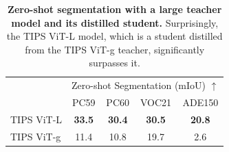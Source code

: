 \begin{table}[t]
\caption{\small\textbf{Zero-shot segmentation with a large teacher model and its distilled student.} Surprisingly, the TIPS ViT-L model, which is a student distilled from the TIPS ViT-g teacher, significantly surpasses it.}
\vspace{-2mm}
\scriptsize
\centering
{
\begin{tabular}{l c c c c}
\small \multirow{2}{*}{Model} & \multicolumn{4}{c}{Zero-shot Segmentation (mIoU) $\uparrow$} \\
 & PC59 & PC60 & VOC21 & ADE150 \\
\midrule
TIPS ViT-L & \bf{33.5} & \bf{30.4} & \bf{30.5} & \bf{20.8} \\
TIPS ViT-g & 11.4 & 10.8 & 19.7 & 2.6 \\
\end{tabular}
}
\vspace{-0mm}
\label{tab:zeroseg_scale}
\end{table}
